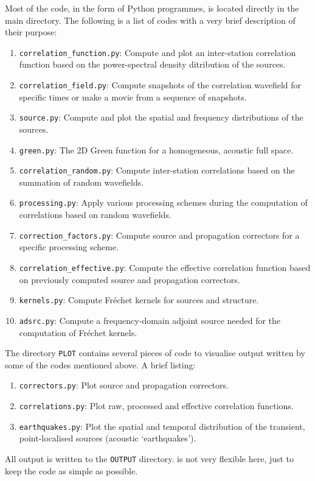 Most of the code, in the form of Python programmes, is located directly in the main directory. The following is a list of codes with a very brief description of their purpose:
\begin{enumerate}
\item \texttt{correlation\_function.py}: Compute and plot an inter-station correlation function based on the power-spectral density ditribution of the sources.\\
\item \texttt{correlation\_field.py}: Compute snapshots of the correlation wavefield for specific times or make a movie from a sequence of snapshots.\\
\item \texttt{source.py}: Compute and plot the spatial and frequency distributions of the sources.\\
\item \texttt{green.py}: The 2D Green function for a homogeneous, acoustic full space.\\
\item \texttt{correlation\_random.py}: Compute inter-station correlations based on the summation of random wavefields.\\
\item \texttt{processing.py}: Apply various processing schemes during the computation of correlations based on random wavefields.\\
\item \texttt{correction\_factors.py}: Compute source and propagation correctors for a specific processing scheme.\\
\item \texttt{correlation\_effective.py}: Compute the effective correlation function based on previously computed source and propagation correctors.\\
\item \texttt{kernels.py}: Compute Fr\'{e}chet kernels for sources and structure.\\
\item \texttt{adsrc.py}: Compute a frequency-domain adjoint source needed for the computation of Fr\'{e}chet kernels.
\end{enumerate}
%
The directory \texttt{PLOT} contains several pieces of code to visualise output written by some of the codes mentioned above. A brief listing:
\begin{enumerate}
\item \texttt{correctors.py}: Plot source and propagation correctors.\\
\item \texttt{correlations.py}: Plot raw, processed and effective correlation functions.\\
\item \texttt{earthquakes.py}: Plot the spatial and temporal distribution of the transient, point-localised sources (acoustic `earthquakes').
\end{enumerate}
%
All output is written to the \texttt{OUTPUT} directory. \GI is not very flexible here, just to keep the code as simple as possible.

